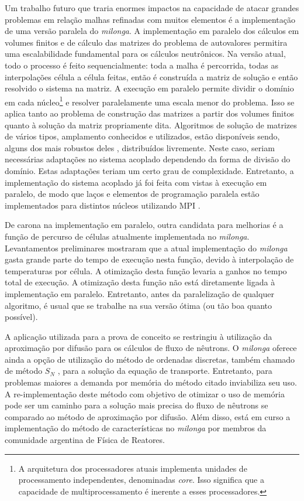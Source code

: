 Um trabalho futuro que traria enormes impactos na capacidade de atacar grandes problemas em relação malhas refinadas
com muitos elementos é a implementação de uma versão paralela do \textit{milonga}. A implementação em paralelo dos
cálculos em volumes finitos e de cálculo das matrizes do problema de autovalores permitira uma escalabilidade
fundamental para os cálculos neutrônicos. Na versão atual, todo o processo é feito sequencialmente: toda a malha
é percorrida, todas as interpolações célula a célula feitas, então é construída a matriz de solução e então resolvido
o sistema na matriz. A execução em paralelo permite dividir o domínio em cada núcleo\footnote{A arquitetura dos processadores
  atuais implementa unidades de processamento independentes, denominadas \textit{core}. Isso significa que a
capacidade de multiprocessamento é inerente a esses processadores.} e resolver paralelamente
uma escala menor do problema. Isso se aplica tanto ao problema de construção das matrizes a partir dos volumes finitos
quanto à solução da matriz propriamente dita. Algoritmos de solução de matrizes de vários tipos, amplamento conhecidos
e utilizados, estão disponíveis sendo, alguns dos mais robustos deles \cite{Hernandez2005, Balay2016}, distribuídos livremente.
Neste caso, seriam necessárias adaptações no sistema acoplado dependendo da forma de divisão do domínio. Estas adaptações teriam
um certo grau de complexidade. Entretanto, a implementação do sistema acoplado já foi feita com vistas à execução em paralelo,
de modo que laços e elementos de programação paralela estão implementados para distintos núcleos utilizando MPI \cite{Quinn2004}.

De carona na implementação em paralelo, outra candidata para melhorias é a função de percurso de células atualmente
implementada no \textit{milonga}. Levantamentos preliminares mostraram que a atual implementação do \textit{milonga}
gasta grande parte do tempo de execução nesta função, devido à interpolação de temperaturas por célula. A otimização
desta função levaria a ganhos no tempo total de execução. A otimização desta função não está diretamente ligada à
implementação em paralelo. Entretanto, antes da paralelização de qualquer algoritmo, é usual que
se trabalhe na sua versão ótima (ou tão boa quanto possível).

A aplicação utilizada para a prova de conceito se restringiu à utilização da aproximação por difusão para os cálculos
de fluxo de nêutrons. O \textit{milonga} oferece ainda a opção de utilização do método de ordenadas discretas,
também chamado de método $S_N$ \cite{Hebert2009}, para a solução da equação de transporte. Entretanto, para problemas
maiores a demanda por memória do método citado inviabiliza seu uso. A re-implementação deste método com objetivo de
otimizar o uso de memória pode ser um caminho para a solução mais precisa do fluxo de nêutrons se comparado ao método
de aproximação por difusão. Além disso, está em curso a implementação do método de características \cite{Hebert2009} no \textit{milonga}
por membros da comunidade argentina de Física de Reatores.

